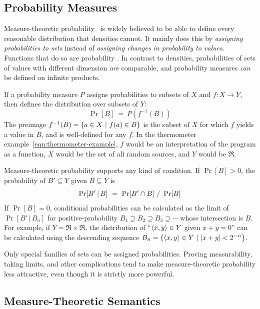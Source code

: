 \subsection{Probability Measures}

Measure-theoretic probability~\cite{cit:klenke-2006-probability} is widely believed to be able to define every reasonable distribution that densities cannot.
It mainly does this by \emph{assigning probabilities to sets} instead of \emph{assigning changes in probability to values}.
Functions that do so are probability .
In contrast to densities, probabilities of sets of values with different dimension \emph{are} comparable, and probability measures \emph{can} be defined on infinite products.

If a probability measure $P$ assigns probabilities to subsets of $X$ and $f : X \to Y$, then  defines the distribution over subsets of $Y$:
\begin{equation}
	\Pr[B] \ = \ P(f^{-1}(B))
\end{equation}
The preimage $f^{-1}(B) = \lbrace {a \in X} \ \lvert\ {f(a) \in B} \rbrace$ is the subset of $X$ for which $f$ yields a value in $B$, and is well-defined for any $f$.
In the thermometer example~\eqref{eqn:thermometer-example}, $f$ would be an interpretation of the program as a function, $X$ would be the set of all random sources, and $Y$ would be $\Re$.

Measure-theoretic probability supports any kind of condition.
If $\Pr[B] > \mathrm{0}$, the probability of $B' \subseteq Y$ given $B \subseteq Y$ is
\begin{equation}
	\Pr[B'\,|\,B]\ =\ \Pr[B' \i B]\ /\ \Pr[B]
\label{eqn:bayes-law-preimage}
\end{equation}
If $\Pr[B] = \mathrm{0}$, conditional probabilities can be calculated as the limit of $\Pr[B'\,|\,B_n]$ for positive-probability $B_1 \supseteq B_2 \supseteq B_3 \supseteq \cdots$ whose intersection is $B$.
For example, if $Y = \Re \times \Re$, the distribution of ``$\langle{x,y}\rangle \in Y$ given $x + y = \mathrm{0}$'' can be calculated using the descending sequence $B_n = \lbrace {\langle{x,y}\rangle \in Y} \ \lvert\ {|x + y| < \mathrm{2}^{-n}} \rbrace$.

Only special families of  sets can be assigned probabilities.
Proving measurability, taking limits, and other complications tend to make measure-theoretic probability less attractive, even though it is strictly more powerful.

\subsection{Measure-Theoretic Semantics}

